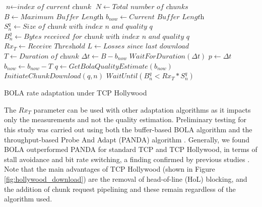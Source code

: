 \begin{algorithm}
	\begin{algorithmic}[1]
		\State $\textit{n} \gets \textit{index of current chunk}$
		\State $N \gets \textit{Total number of chunks}$
		\State $B \gets \textit{Maximum Buffer Length}$
		\State $b_{now} \gets \textit{Current Buffer Length}$
		\State $S_n^q \gets \textit{Size of chunk with index n and quality q}$
		\State $B_n^q  \gets \textit{Bytes received for chunk with index n and quality q }$
		\State $Rx_T \gets \textit{Receive Threshold}$
		\State $L \gets \textit{Losses since last download}$
		\State $T \gets \textit{Duration of chunk}$
				\State $\Delta t \gets B - b_{now}$
				\State $WaitForDuration (\Delta t)$
			\EndIf
			\State $p \gets \Delta t$
				\State $b_{now} \gets b_{now} - T$
			\EndIf
			\State ${q \gets GetBolaQualityEstimate(b_{now})}$		
			\State $InitiateChunkDownload(q, n)$
			\State $WaitUntil (B_n^q < Rx_T * S_n^q)$
		\EndWhile
		\EndProcedure
	\end{algorithmic}
	\caption{BOLA rate adaptation under TCP Hollywood}
	\label{algo:tcph_dash}
\end{algorithm}

The $Rx_{T}$ parameter can be used with other adaptation algorithms as it impacts only the measurements and not the quality estimation. Preliminary testing for this study was carried out using both the buffer-based BOLA algorithm and the throughput-based Probe And Adapt (PANDA) algorithm \cite{li2014probe}. Generally, we found BOLA outperformed PANDA for standard TCP and TCP Hollywood, in terms of stall avoidance and bit rate switching, a finding confirmed by previous studies \cite{karagkioules2017comparative}. Note that the main advantages of TCP Hollywood (shown in Figure \ref{fig:hollywood_download}) are the removal of head-of-line (HoL) blocking, and the addition of chunk request pipelining and these remain regardless of the algorithm used. 
